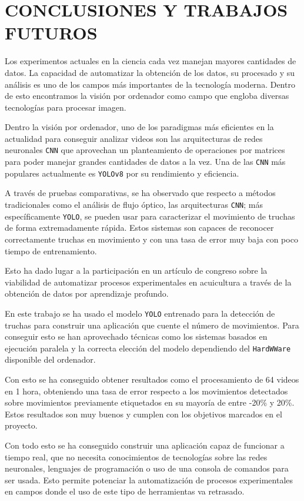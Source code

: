\section{CONCLUSIONES Y TRABAJOS FUTUROS}

Los experimentos actuales en la ciencia cada vez manejan mayores cantidades de datos. La capacidad de automatizar la obtención de los datos, su procesado y su análisis es uno de los campos más importantes 
de la tecnología moderna. Dentro de esto encontramos la visión por ordenador como campo que engloba diversas tecnologías para procesar imagen.

Dentro la visión por ordenador, uno de los paradigmas más eficientes en la actualidad para conseguir analizar videos son las arquitecturas de redes neuronales \texttt{CNN} que aprovechan un planteamiento de 
operaciones por matrices para poder manejar grandes cantidades de datos a la vez. Una de las \texttt{CNN} más populares actualmente es \texttt{YOLOv8} por su rendimiento y eficiencia.

A través de pruebas comparativas, se ha observado que respecto a métodos tradicionales como el análisis de flujo óptico, las arquitecturas \texttt{CNN}; más específicamente \texttt{YOLO}, se pueden usar 
para caracterizar el movimiento de truchas de forma extremadamente rápida. Estos sistemas son capaces de reconocer correctamente truchas en movimiento y con una tasa de error muy baja con poco tiempo de entrenamiento.

Esto ha dado lugar a la participación en un artículo de congreso sobre la viabilidad de automatizar procesos experimentales en acuicultura a través de la obtención de datos por aprendizaje profundo.

En este trabajo se ha usado el modelo \texttt{YOLO} entrenado para la detección de truchas para construir una aplicación que cuente el número de movimientos. Para conseguir esto se han aprovechado técnicas como 
los sistemas basados en ejecución paralela y la correcta elección del modelo dependiendo del \texttt{HardWWare} disponible del ordenador.

Con esto se ha conseguido obtener resultados como el procesamiento de 64 videos en 1 hora, obteniendo una tasa de error respecto a los movimientos detectados sobre movimientos 
previamente etiquetados en su mayoría de entre -20\% y 20\%. \newline
Estos resultados son muy buenos y cumplen con los objetivos marcados en el proyecto.

Con todo esto se ha conseguido construir una aplicación capaz de funcionar a tiempo real, que no necesita conocimientos de tecnologías sobre las redes neuronales, lenguajes de programación o 
uso de una consola de comandos para ser usada. Esto permite potenciar la automatización de procesos experimentales en campos donde el uso de este tipo de herramientas va retrasado.

